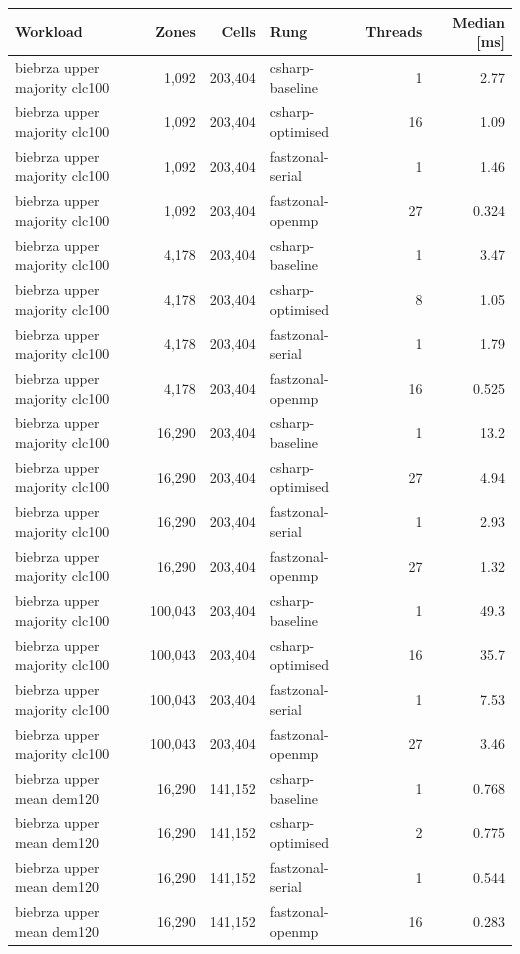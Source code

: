 \begin{tabular}{lrrlrr}
\toprule
Workload & Zones & Cells & Rung & Threads & Median [ms] \\
\midrule
biebrza upper majority clc100 & 1,092 & 203,404 & csharp-baseline & 1 & 2.77 \\
biebrza upper majority clc100 & 1,092 & 203,404 & csharp-optimised & 16 & 1.09 \\
biebrza upper majority clc100 & 1,092 & 203,404 & fastzonal-serial & 1 & 1.46 \\
biebrza upper majority clc100 & 1,092 & 203,404 & fastzonal-openmp & 27 & 0.324 \\
biebrza upper majority clc100 & 4,178 & 203,404 & csharp-baseline & 1 & 3.47 \\
biebrza upper majority clc100 & 4,178 & 203,404 & csharp-optimised & 8 & 1.05 \\
biebrza upper majority clc100 & 4,178 & 203,404 & fastzonal-serial & 1 & 1.79 \\
biebrza upper majority clc100 & 4,178 & 203,404 & fastzonal-openmp & 16 & 0.525 \\
biebrza upper majority clc100 & 16,290 & 203,404 & csharp-baseline & 1 & 13.2 \\
biebrza upper majority clc100 & 16,290 & 203,404 & csharp-optimised & 27 & 4.94 \\
biebrza upper majority clc100 & 16,290 & 203,404 & fastzonal-serial & 1 & 2.93 \\
biebrza upper majority clc100 & 16,290 & 203,404 & fastzonal-openmp & 27 & 1.32 \\
biebrza upper majority clc100 & 100,043 & 203,404 & csharp-baseline & 1 & 49.3 \\
biebrza upper majority clc100 & 100,043 & 203,404 & csharp-optimised & 16 & 35.7 \\
biebrza upper majority clc100 & 100,043 & 203,404 & fastzonal-serial & 1 & 7.53 \\
biebrza upper majority clc100 & 100,043 & 203,404 & fastzonal-openmp & 27 & 3.46 \\
biebrza upper mean dem120 & 16,290 & 141,152 & csharp-baseline & 1 & 0.768 \\
biebrza upper mean dem120 & 16,290 & 141,152 & csharp-optimised & 2 & 0.775 \\
biebrza upper mean dem120 & 16,290 & 141,152 & fastzonal-serial & 1 & 0.544 \\
biebrza upper mean dem120 & 16,290 & 141,152 & fastzonal-openmp & 16 & 0.283 \\

\end{tabular}
